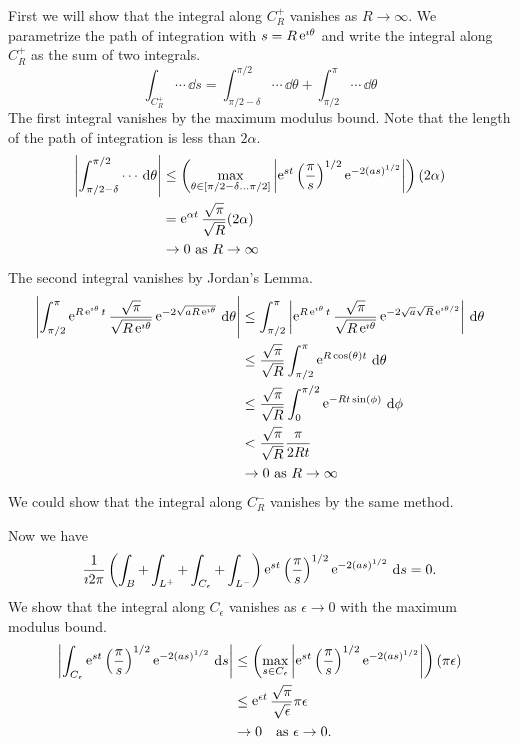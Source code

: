 {\begin{Solution}
  First we will show that the integral along
  $C_R^+$ vanishes as $R \to \infty$.  We parametrize the path of integration
  with $s = R \mathop{\mathrm{e}}\nolimits^{\imath \theta}$ and write the integral along $C_R^+$ as the sum
  of two integrals.
  \[
  \int_{C_R^+} \cdots \,\dd s = \int_{\pi/2-\delta}^{\pi/2} \cdots \,\dd \theta + \int_{\pi/2}^\pi \cdots \,\dd \theta
  \]
  The first integral vanishes by the maximum modulus bound.  
  Note that the length of the path of integration is less than $2 \alpha$.
  \begin{align*}
    \left| \int_{\pi/2-\delta}^{\pi/2} \cdots \,\mathrm{d} \theta \right|
    &\leq \left( \max_{\theta \in [\pi/2-\delta \ldots \pi/2]}
      \left| \mathop{\mathrm{e}}\nolimits^{s t} \left( \frac{\pi}{s} \right)^{1/2} \mathop{\mathrm{e}}\nolimits^{-2 (a s)^{1/2}}
      \right| \right) (2 \alpha) \\
    &= \mathop{\mathrm{e}}\nolimits^{\alpha t} \frac{\sqrt{\pi}}{\sqrt{R}} (2 \alpha) \\
    &\to 0\ \mathrm{as}\ R \to \infty
  \end{align*}
  The second integral vanishes by Jordan's Lemma.
  \begin{align*}
    \left| \int_{\pi/2}^\pi \mathop{\mathrm{e}}\nolimits^{R \mathop{\mathrm{e}}\nolimits^{\imath \theta} t} 
      \frac{\sqrt{\pi}}{\sqrt{R \mathop{\mathrm{e}}\nolimits^{\imath \theta}}}
      \mathop{\mathrm{e}}\nolimits^{-2 \sqrt{a R \mathop{\mathrm{e}}\nolimits^{\imath \theta} } } \,\mathrm{d} \theta \right| 
    &\leq \int_{\pi/2}^\pi \left| \mathop{\mathrm{e}}\nolimits^{R \mathop{\mathrm{e}}\nolimits^{\imath \theta} t} 
      \frac{\sqrt{\pi}}{\sqrt{R \mathop{\mathrm{e}}\nolimits^{\imath \theta}}}
      \mathop{\mathrm{e}}\nolimits^{-2 \sqrt{a} \sqrt{R} \mathop{\mathrm{e}}\nolimits^{\imath \theta/2} } \right| \,\mathrm{d} \theta\\
    &\leq \frac{\sqrt{\pi}}{\sqrt{R}} \int_{\pi/2}^\pi \mathop{\mathrm{e}}\nolimits^{R \cos(\theta) t} \,\mathrm{d} \theta \\
    &\leq \frac{\sqrt{\pi}}{\sqrt{R}} \int_0^{\pi/2} \mathop{\mathrm{e}}\nolimits^{- R t \sin(\phi)} \,\mathrm{d} \phi \\
    &< \frac{\sqrt{\pi}}{\sqrt{R}} \frac{\pi}{2 R t} \\
    &\to 0\ \mathrm{as}\ R \to \infty
  \end{align*}
  We could show that the integral along $C_R^-$ vanishes by the same method.

  Now we have
  \[
  \frac{1}{\imath 2 \pi} \left( \int_B + \int_{L^+} + \int_{C_\epsilon} + \int_{L^-} \right)
  \mathop{\mathrm{e}}\nolimits^{s t} \left( \frac{\pi}{s} \right)^{1/2} \mathop{\mathrm{e}}\nolimits^{-2 (a s)^{1/2} } \,\mathrm{d} s = 0.
  \]
  We show that the integral along $C_\epsilon$ vanishes as
  $\epsilon \to 0$ with the maximum modulus bound.  
  \begin{align*}
    \left| \int_{C_\epsilon} \mathop{\mathrm{e}}\nolimits^{s t} \left( \frac{\pi}{s} \right)^{1/2} \mathop{\mathrm{e}}\nolimits^{-2 (a s)^{1/2}}
      \,\mathrm{d} s \right|
    &\leq \left(\max_{s \in C_\epsilon} \left| 
        \mathop{\mathrm{e}}\nolimits^{s t} \left( \frac{\pi}{s} \right)^{1/2} \mathop{\mathrm{e}}\nolimits^{-2 (a s)^{1/2}}
      \right| \right) (\pi \epsilon) \\
    &\leq \mathop{\mathrm{e}}\nolimits^{\epsilon t} \frac{\sqrt{\pi}}{\sqrt{\epsilon}} \pi \epsilon\\
    &\to 0 \quad \mathrm{as}\ \epsilon \to 0.
  \end{align*}




\end{Solution}}
